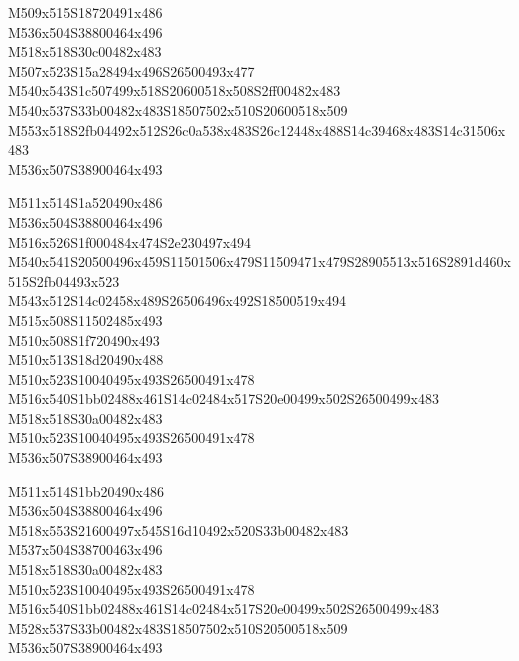 \documentclass{article}
\begin{document}
\begin{multicols}{5}
\begin{center}

M509x515S18720491x486 %
\\M536x504S38800464x496 %
\\M518x518S30c00482x483 %
\\M507x523S15a28494x496S26500493x477 %
\\M540x543S1c507499x518S20600518x508S2ff00482x483 %
\\M540x537S33b00482x483S18507502x510S20600518x509 %
\\M553x518S2fb04492x512S26c0a538x483S26c12448x488S14c39468x483S14c31506x483 %
\\M536x507S38900464x493 %
\vfil
\columnbreak

M511x514S1a520490x486 %
\\M536x504S38800464x496 %
\\M516x526S1f000484x474S2e230497x494 %
\\M540x541S20500496x459S11501506x479S11509471x479S28905513x516S2891d460x515S2fb04493x523 %
\\M543x512S14c02458x489S26506496x492S18500519x494 %
\\M515x508S11502485x493 %
\\M510x508S1f720490x493 %
\\M510x513S18d20490x488 %
\\M510x523S10040495x493S26500491x478 %
\\M516x540S1bb02488x461S14c02484x517S20e00499x502S26500499x483 %
\\M518x518S30a00482x483 %
\\M510x523S10040495x493S26500491x478 %
\\M536x507S38900464x493 %
\vfil
\columnbreak

M511x514S1bb20490x486 %
\\M536x504S38800464x496 %
\\M518x553S21600497x545S16d10492x520S33b00482x483 %
\\M537x504S38700463x496 %
\\M518x518S30a00482x483 %
\\M510x523S10040495x493S26500491x478 %
\\M516x540S1bb02488x461S14c02484x517S20e00499x502S26500499x483 %
\\M528x537S33b00482x483S18507502x510S20500518x509 %
\\M536x507S38900464x493 %
\vfil
\columnbreak


\end{center}
\end{multicols}
\end{document}
